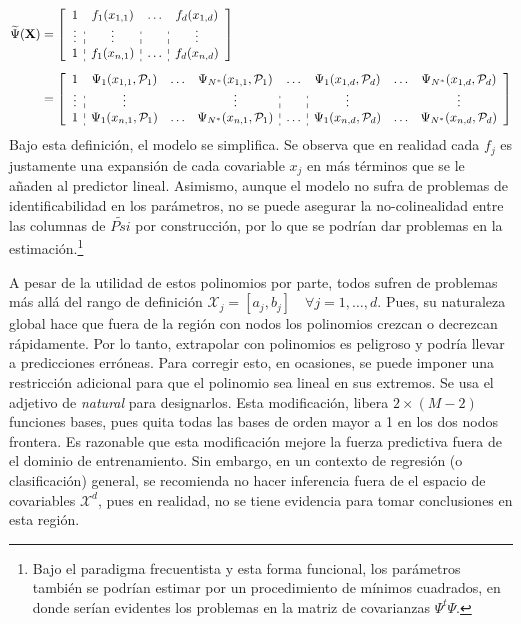 \documentclass[../Main/Main.tex]{subfiles}
\begin{document}
\begin{align}
\widetilde{\Psi}(\xmat) &= 
\left[
\begin{array}{c:c:c:c}
1 & f_1(x_{1,1}) & \ldots & f_d(x_{1,d}) \\
\vdots & \vdots & ~ & \vdots \\
1 & f_1(x_{n,1}) & \ldots & f_d(x_{n,d}) 
\end{array} 
\right] \label{ec:PsiTilde}\\[5pt]
&=
\left[
\begin{array}{c:ccc:c:ccc}
1 & \Psi_1(x_{1,1},\P_1) & \ldots & \Psi_{\N}(x_{1,1},\P_1) & \ldots & \Psi_1(x_{1,d},\P_d) & \ldots & \Psi_{\N}(x_{1,d},\P_d)\\
\vdots & \vdots & ~ & \vdots & ~ & \vdots & ~ & \vdots \\
1 & \Psi_1(x_{n,1},\P_1) & \ldots & \Psi_{\N}(x_{n,1},\P_1) & \ldots & \Psi_1(x_{n,d},\P_d) & \ldots & \Psi_{\N}(x_{n,d},\P_d)
\end{array}
\right]\nonumber
\end{align}
Bajo esta definición, el modelo se simplifica. Se observa que en realidad cada $f_j$ es justamente una expansión de cada covariable $x_j$ en más términos que se le añaden al predictor lineal. Asimismo, aunque el modelo no sufra de problemas de identificabilidad en los parámetros, no se puede asegurar la no-colinealidad entre las columnas de $\widetilde{Psi}$ por construcción, por lo que se podrían dar problemas en la estimación.\footnote{Bajo el paradigma frecuentista y esta forma funcional, los parámetros también se podrían estimar por un procedimiento de mínimos cuadrados, en donde serían evidentes los problemas en la matriz de covarianzas $\Psi^t\Psi$.}

A pesar de la utilidad de estos polinomios por parte, todos sufren de problemas más allá del rango de definición $\mathcal{X}_j = [a_j,b_j] \quad \forall j = 1,\ldots,d$. Pues, su naturaleza global hace que fuera de la región con nodos los polinomios crezcan o decrezcan rápidamente. Por lo tanto, extrapolar con polinomios es peligroso y podría llevar a predicciones erróneas. Para corregir esto, en ocasiones, se puede imponer una restricción adicional para que el polinomio sea lineal en sus extremos. Se usa el adjetivo de \textit{natural} para designarlos. Esta modificación, libera $2\times(M-2)$ funciones bases, pues quita todas las bases de orden mayor a 1 en los dos nodos frontera. Es razonable que esta modificación mejore la fuerza predictiva fuera de el dominio de entrenamiento. Sin embargo, en un contexto de regresión (o clasificación) general, se recomienda no hacer inferencia fuera de el espacio de covariables $\mathcal{X}^d$, pues en realidad, no se tiene evidencia para tomar conclusiones en esta región.
\end{document}
